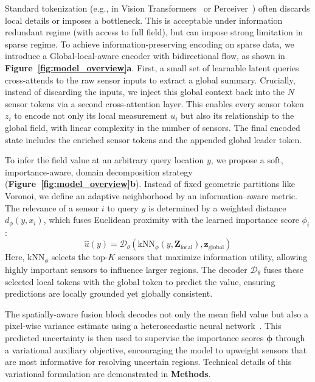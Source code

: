 \documentclass[pdflatex,sn-nature]{sn-jnl}%
\begin{document}
Standard tokenization (e.g., in Vision Transformers~\cite{dosovitskiy2021an} or Perceiver~\cite{pmlr-v139-jaegle21a}) often discards local details or imposes a bottleneck.
This is acceptable under information redundant regime (with access to full field), but can impose strong limitation in sparse regime.
To achieve information-preserving encoding on sparse data, we introduce a Global-local-aware encoder with bidirectional flow, as shown in \textbf{Figure~\ref{fig:model_overview}a}.
First, a small set of learnable latent queries cross-attends to the raw sensor inputs to extract a global summary. 
Crucially, instead of discarding the inputs, we inject this global context back into the $N$ sensor tokens via a second cross-attention layer. 
This enables every sensor token $z_i$ to encode not only its local measurement $u_i$ but also its relationship to the global field, with linear complexity in the number of sensors. 
The final encoded state includes the enriched sensor tokens and the appended global leader token.

To infer the field value at an arbitrary query location $y$, we propose a soft, importance-aware, domain decomposition strategy (\textbf{Figure~\ref{fig:model_overview}b}). 
Instead of fixed geometric partitions like Voronoi, we define an adaptive neighborhood by an information--aware metric. 
The relevance of a sensor $i$ to query $y$ is determined by a weighted distance $d_{\phi}(y, x_i)$, which fuses Euclidean proximity with the learned importance score $\phi_i$:
\begin{equation}
    \hat{u}(y) = \mathcal{D}_{\theta}\left( \text{kNN}_{\phi}(y, \mathbf{Z}_{\text{local}}), \mathbf{z}_{\text{global}} \right)
\end{equation}
Here, $\text{kNN}_{\phi}$ selects the top-$K$ sensors that maximize information utility, allowing highly important sensors to influence larger regions. 
The decoder $\mathcal{D}_{\theta}$ fuses these selected local tokens with the global token to predict the value, ensuring predictions are locally grounded yet globally consistent.

The spatially-aware fusion block decodes not only the mean field value but also a pixel-wise variance estimate using a heteroscedastic neural network~\cite{Xia_2025_CVPR}.
This predicted uncertainty is then used to supervise the importance scores $\boldsymbol{\phi} $ through a variational auxiliary objective, encouraging the model to upweight sensors that are most informative for resolving uncertain regions.
Technical details of this variational formulation are demonstrated in \textbf{Methods}.
\end{document}

